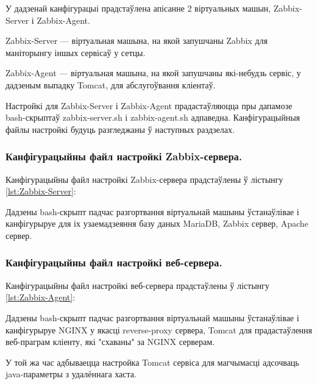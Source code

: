 

У дадзенай канфігурацыі прадстаўлена апісанне 2 віртуальных машын,
Zabbix-Server і Zabbix-Agent.

Zabbix-Server --- віртуальная машына, на якой запушчаны Zabbix для
маніторынгу іншых сервісаў у сетцы.

Zabbix-Agent --- віртуальная машына, на якой запушчаны які-небудзь сервіс,
у дадзеным выпадку Tomcat, для абслугоўвання кліентаў.

Настройкі для Zabbix-Server і Zabbix-Agent прадастаўляюцца пры дапамозе
bash-скрыптаў zabbix-server.sh і zabbix-agent.sh адпаведна.
Канфігурацыйныя файлы настройкі будуць разгледжаны ў наступных раздзелах.

\subsubsection{Канфігурацыйны файл настройкі Zabbix-сервера.}
Канфігурацыйны файл настройкі Zabbix-сервера прадстаўлены ў лістынгу
\ref{lst:Zabbix-Server}:



Дадзены bash-скрыпт падчас разгортвання віртуальнай машыны
ўстанаўлівае і канфігурыруе для іх узаемадзеяння
базу даных MariaDB, Zabbix сервер, Apache сервер.

\subsubsection{Канфігурацыйны файл настройкі веб-сервера.}
Канфігурацыйны файл настройкі веб-сервера прадстаўлены ў лістынгу
\ref{lst:Zabbix-Agent}:



Дадзены bash-скрыпт падчас разгортвання віртуальнай машыны
ўстанаўлівае і канфігурыруе NGINX у якасці reverse-proxy сервера,
Tomcat для прадастаўлення веб-праграм кліенту, які "схаваны" за NGINX серверам.

У той жа час адбываецца настройка Tomcat сервіса для магчымасці адсочваць
java-параметры з удалённага хаста.

